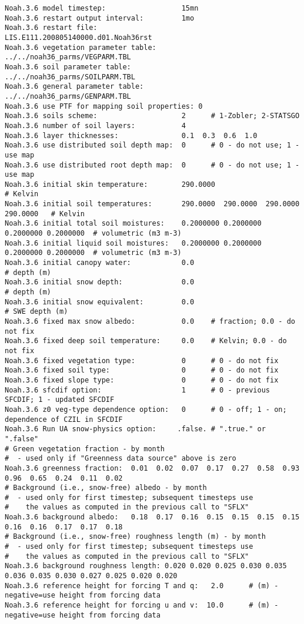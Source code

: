  \begin{Verbatim}[frame=single]
Noah.3.6 model timestep:                  15mn
Noah.3.6 restart output interval:         1mo
Noah.3.6 restart file:                    LIS.E111.200805140000.d01.Noah36rst
Noah.3.6 vegetation parameter table:      ../../noah36_parms/VEGPARM.TBL
Noah.3.6 soil parameter table:            ../../noah36_parms/SOILPARM.TBL
Noah.3.6 general parameter table:         ../../noah36_parms/GENPARM.TBL
Noah.3.6 use PTF for mapping soil properties: 0
Noah.3.6 soils scheme:                    2      # 1-Zobler; 2-STATSGO
Noah.3.6 number of soil layers:           4
Noah.3.6 layer thicknesses:               0.1  0.3  0.6  1.0
Noah.3.6 use distributed soil depth map:  0      # 0 - do not use; 1 - use map
Noah.3.6 use distributed root depth map:  0      # 0 - do not use; 1 - use map
Noah.3.6 initial skin temperature:        290.0000                                 # Kelvin
Noah.3.6 initial soil temperatures:       290.0000  290.0000  290.0000  290.0000   # Kelvin
Noah.3.6 initial total soil moistures:    0.2000000 0.2000000 0.2000000 0.2000000  # volumetric (m3 m-3)
Noah.3.6 initial liquid soil moistures:   0.2000000 0.2000000 0.2000000 0.2000000  # volumetric (m3 m-3)
Noah.3.6 initial canopy water:            0.0                                      # depth (m)
Noah.3.6 initial snow depth:              0.0                                      # depth (m)
Noah.3.6 initial snow equivalent:         0.0                                      # SWE depth (m)
Noah.3.6 fixed max snow albedo:           0.0    # fraction; 0.0 - do not fix
Noah.3.6 fixed deep soil temperature:     0.0    # Kelvin; 0.0 - do not fix
Noah.3.6 fixed vegetation type:           0      # 0 - do not fix
Noah.3.6 fixed soil type:                 0      # 0 - do not fix
Noah.3.6 fixed slope type:                0      # 0 - do not fix
Noah.3.6 sfcdif option:                   1      # 0 - previous SFCDIF; 1 - updated SFCDIF
Noah.3.6 z0 veg-type dependence option:   0      # 0 - off; 1 - on; dependence of CZIL in SFCDIF
Noah.3.6 Run UA snow-physics option:     .false. # ".true." or ".false"
# Green vegetation fraction - by month
#  - used only if "Greenness data source" above is zero
Noah.3.6 greenness fraction:  0.01  0.02  0.07  0.17  0.27  0.58  0.93  0.96  0.65  0.24  0.11  0.02
# Background (i.e., snow-free) albedo - by month
#  - used only for first timestep; subsequent timesteps use
#    the values as computed in the previous call to "SFLX"
Noah.3.6 background albedo:   0.18  0.17  0.16  0.15  0.15  0.15  0.15  0.16  0.16  0.17  0.17  0.18
# Background (i.e., snow-free) roughness length (m) - by month
#  - used only for first timestep; subsequent timesteps use
#    the values as computed in the previous call to "SFLX"
Noah.3.6 background roughness length: 0.020 0.020 0.025 0.030 0.035 0.036 0.035 0.030 0.027 0.025 0.020 0.020
Noah.3.6 reference height for forcing T and q:   2.0      # (m) - negative=use height from forcing data
Noah.3.6 reference height for forcing u and v:  10.0      # (m) - negative=use height from forcing data
 \end{Verbatim}

